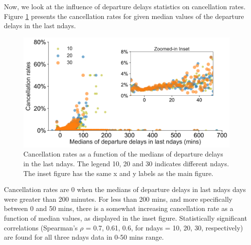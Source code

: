 \documentclass[12pt]{article}
\begin{document}
Now, we look at the influence of departure delays statistics on cancellation rates. Figure \ref{fig:depdelaymediancanrate} presents the cancellation rates for given median values of the departure delays in the last ndays. 
\begin{figure}[h!]
\begin{center}
\includegraphics[width=6in]{depdelaymedian_canrate.pdf}
\end{center}
\caption{\label{fig:depdelaymediancanrate}
Cancellation rates as a function of the medians of departure delays in the last ndays. The legend 10, 20 and 30 indicates different ndays. The inset figure has the same x and y labels as the main figure.}
\end{figure}

Cancellation rates are 0 when the medians of departure delays in last ndays days were greater than 200 minutes. For less than 200 mins, and more specifically between 0 and 50 mins, there is a somewhat increasing cancellation rate as a function of median values, as displayed in the inset figure. Statistically significant correlations (Spearman's $\rho$ = 0.7, 0.61, 0.6, for ndays = 10, 20, 30, respectively) are found for all three ndays data in 0-50 mins range.  
\end{document}
